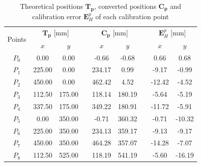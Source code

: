 \documentclass[a4paper, 10 pt, conference]{ieeeconf}      %
\begin{document}
\begin{table}[h!]
	\centering
	\caption{Theoretical positions $\mathbf{T_p}$, converted positions $\mathbf{C_p}$ and calibration error $\mathbf{E}^p_{H}$ of each calibration point}
	\label{tab:calibrationH}
	\begin{adjustbox}{max width=\columnwidth}
		\begin{tabular}{ccccccccc}
			\toprule
			\multirow{2}{*}{Points} & \multicolumn{2}{c}{$\mathbf{T_p}$ [mm]} &  & \multicolumn{2}{c}{$\mathbf{C_p}$ [mm]} &  & \multicolumn{2}{c}{$\mathbf{E}^p_{H}$ [mm]} \\ \cmidrule{2-3} \cmidrule{5-6} \cmidrule{8-9} 
			& $x$                & $y$               &  & $x$                     & $y$                     &  & $x$                   & $y$                  \\ \midrule
			$P_0$               & 0.00               & 0.00                   &  & -0.66                      & -0.68                  &  & 0.66                  & 0.68    \\
			$P_1$               & 225.00           & 0.00                   &  & 234.17                   & 0.99                    &  & -9.17                 & -0.99   \\
			$P_2$               & 450.00           & 0.00                   &  & 462.42                   & 4.52                    &  & -12.42               & -4.52   \\
			$P_3$               & 112.50           & 175.00               &  & 118.14                   & 180.19                &  & -5.64                 & -5.19   \\
			$P_4$               & 337.50           & 175.00               &  & 349.22                   & 180.91                &  & -11.72               & -5.91   \\
			$P_5$               & 0.00               & 350.00               &  & -0.71                      & 360.32                &  & -0.71                 & -10.32   \\
			$P_6$               & 225.00           & 350.00               &  & 234.13                   & 359.17                 &  & -9.13                & -9.17   \\
                                $P_7$               & 450.00           & 350.00               &  & 464.28                    & 357.07                &  & -14.28              & -7.07  \\
                                $P_8$               & 112.50           & 525.00               &  & 118.19                    & 541.19                &  & -5.60                 & -16.19  \\

\end{tabular}
\end{adjustbox}
\end{table}
\end{document}
